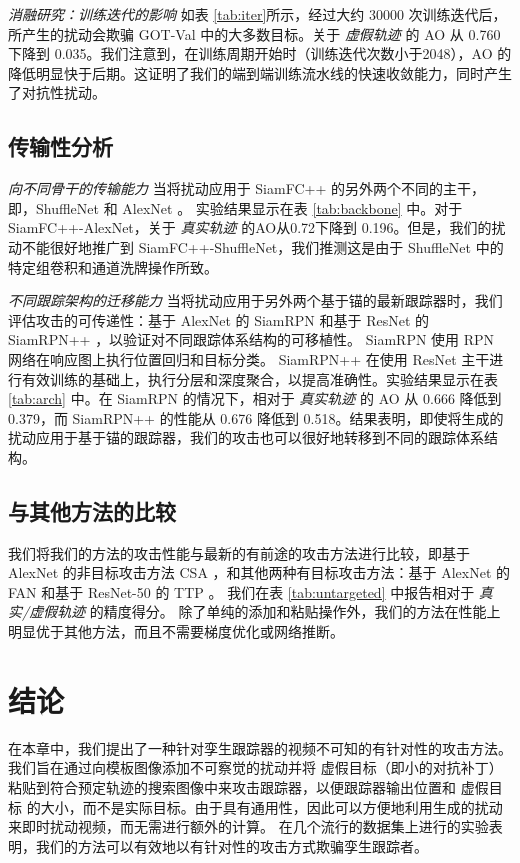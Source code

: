 \textit{消融研究：训练迭代的影响} 如表 \ref{tab:iter}所示，经过大约 30000 次训练迭代后，所产生的扰动会欺骗 GOT-Val 中的大多数目标。关于 \textit{虚假轨迹} 的 AO 从 0.760 下降到 0.035。我们注意到，在训练周期开始时（训练迭代次数小于2048），AO 的降低明显快于后期。这证明了我们的端到端训练流水线的快速收敛能力，同时产生了对抗性扰动。

\subsection{传输性分析}

\textit{向不同骨干的传输能力} 当将扰动应用于 SiamFC++ 的另外两个不同的主干，即，ShuffleNet \cite{ShuffleNet} 和 AlexNet \cite{AlexNet}。
实验结果显示在表 \ref{tab:backbone} 中。对于 SiamFC++-AlexNet，关于 \textit{真实轨迹} 的AO从0.72下降到 0.196。但是，我们的扰动不能很好地推广到 SiamFC++-ShuffleNet，我们推测这是由于 ShuffleNet 中的特定组卷积和通道洗牌操作所致。

\textit{不同跟踪架构的迁移能力} 当将扰动应用于另外两个基于锚的最新跟踪器时，我们评估攻击的可传递性：基于 AlexNet 的 SiamRPN \cite{SiamRPN} 和基于 ResNet 的 SiamRPN++ \cite{SiamRPN++}，以验证对不同跟踪体系结构的可移植性。
SiamRPN 使用 RPN 网络在响应图上执行位置回归和目标分类。 SiamRPN++ 在使用 ResNet 主干进行有效训练的基础上，执行分层和深度聚合，以提高准确性。实验结果显示在表 \ref{tab:arch} 中。在 SiamRPN 的情况下，相对于 \textit{真实轨迹} 的 AO 从 0.666 降低到 0.379，而 SiamRPN++ 的性能从 0.676 降低到 0.518。结果表明，即使将生成的扰动应用于基于锚的跟踪器，我们的攻击也可以很好地转移到不同的跟踪体系结构。

\subsection{与其他方法的比较}

我们将我们的方法的攻击性能与最新的有前途的攻击方法进行比较，即基于 AlexNet 的非目标攻击方法 CSA \cite{CSA}，和其他两种有目标攻击方法：基于 AlexNet 的 FAN \cite{FAN} 和基于 ResNet-50 的 TTP \cite{TTP}。
我们在表 \ref{tab:untargeted} 中报告相对于 \textit{真实/虚假轨迹} 的精度得分。
除了单纯的添加和粘贴操作外，我们的方法在性能上明显优于其他方法，而且不需要梯度优化或网络推断。

\section{结论}

在本章中，我们提出了一种针对孪生跟踪器的视频不可知的有针对性的攻击方法。
我们旨在通过向模板图像添加不可察觉的扰动并将 虚假目标（即小的对抗补丁）粘贴到符合预定轨迹的搜索图像中来攻击跟踪器，以便跟踪器输出位置和 虚假目标 的大小，而不是实际目标。由于具有通用性，因此可以方便地利用生成的扰动来即时扰动视频，而无需进行额外的计算。
在几个流行的数据集上进行的实验表明，我们的方法可以有效地以有针对性的攻击方式欺骗孪生跟踪者。


